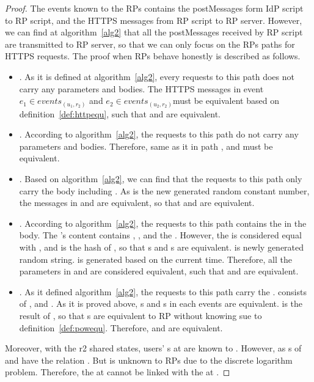 \begin{appendices}
\begin{proof}
The events known to the RPs contains the postMessages form IdP script to RP script, and the HTTPS messages from RP script to RP server. However, we can find at algorithm~\ref{alg2} that all the postMessages received by RP script are transmitted to RP server, so that we can only focus on the RPs paths for HTTPS requests. The proof when RPs behave honestly is described as follows. 
\begin{itemize}
\item {}. As it is defined at algorithm~\ref{alg2}, every requests to this path does not carry any parameters and bodies. The HTTPS messages in event $e_1 \in events_{(u_1, r_2)}$ and $e_2 \in events_{(u_2, r_2)}$must be equivalent based on definition~\ref{def:httpequ}, such that  and  are equivalent.
\item {}. According to algorithm~\ref{alg2}, the requests to this path do not carry any parameters and bodies. Therefore, same as it in path ,  and  must be equivalent.
\item {}. Based on  algorithm~\ref{alg2}, we can find that the requests to this path only carry the body including . As  is the new generated random constant number, the messages in  and  are equivalent, so that  and  are equivalent.
\item {}. According to  algorithm~\ref{alg2}, the requests to this path contains the  in the body. The 's content contains , ,  and the . However, the  is considered equal with , and  is the hash of , so that s and s are equivalent.  is newly generated random string.  is generated based on the current time. Therefore, all the parameters in  and  are considered equivalent, such that  and  are equivalent. 
\item {}.  As it defined algorithm~\ref{alg2}, the requests to this path carry the .  consists of ,  and . As it is proved above, s and s in each events are equivalent.  is the result of , so that s are equivalent to RP without knowing  sue to definition~\ref{def:powequ}. Therefore,   and  are equivalent. 
\end{itemize}
Moreover, with the r2 shared states, users' s at  are known
to  . However, as s of  and  have the relation  \myss{\equiv}  . But  is unknown to RPs due to the discrete logarithm problem. Therefore, the  at  cannot be linked with the  at . 


\end{proof}
\end{appendices}
